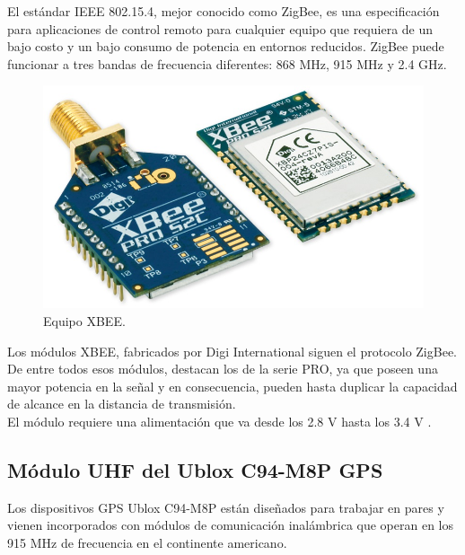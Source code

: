 El estándar IEEE 802.15.4, mejor conocido como ZigBee, es una especificación para aplicaciones de control remoto para cualquier equipo que requiera de un bajo costo y un bajo consumo de potencia en entornos reducidos. ZigBee puede funcionar a tres bandas de frecuencia diferentes: 868 MHz, 915 MHz y 2.4 GHz. \\

\begin{figure}[ht]
\centering
\includegraphics[scale=0.20]{Figures/xbee}
\caption[Equipo XBEE.]{Equipo XBEE\footnotemark.}
\label{fig:XBEE}
\end{figure}


Los módulos XBEE, fabricados por Digi International siguen el protocolo ZigBee. De entre todos esos módulos, destacan los de la serie PRO, ya que poseen una mayor potencia en la señal y en consecuencia, pueden hasta duplicar la capacidad de alcance en la distancia de transmisión. \\

El módulo requiere una alimentación que va desde los 2.8 V hasta los 3.4 V \cite{oyarce2010guia}.

\subsection{Módulo UHF del Ublox C94-M8P GPS}

Los dispositivos GPS Ublox C94-M8P están diseñados para trabajar en pares y vienen incorporados con módulos de comunicación inalámbrica que operan en los 915 MHz de frecuencia en el continente americano. \\

